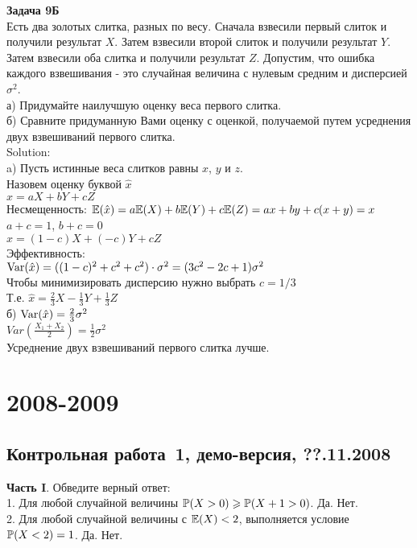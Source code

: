 \documentclass[pdftex,12pt,a4paper]{article}
\begin{document}
\textbf{Задача 9Б} \\
Есть два золотых слитка, разных по весу. Сначала взвесили первый слиток и получили результат $X$. Затем взвесили второй слиток и получили результат $Y$. Затем взвесили оба слитка и получили результат $Z$. Допустим, что ошибка каждого взвешивания - это случайная величина с нулевым средним и дисперсией $\sigma^{2}$. \\
а) Придумайте наилучшую оценку веса первого слитка. \\
б) Сравните придуманную Вами оценку с оценкой, получаемой путем усреднения двух взвешиваний первого слитка. \\ 
Solution: \\
a) Пусть истинные веса слитков равны $x$, $y$ и $z$. \\
Назовем оценку буквой $\hat{x}$ \\
$\hat{x}=aX+bY+cZ$ \\
Несмещенность: $\E(\hat{x})=a\E(X)+b\E(Y)+c\E(Z)=ax+by+c(x+y)=x$ \\
$a+c=1$, $b+c=0$ \\
$\hat{x}=(1-c)X+(-c)Y+cZ$ \\
Эффективность: \\
$\Var(\hat{x})=((1-c)^{2}+c^{2}+c^{2})\cdot \sigma^{2}=(3c^{2}-2c+1)\sigma^{2}$ \\
Чтобы минимизировать дисперсию нужно выбрать $c=1/3$ \\
Т.е. $\hat{x}=\frac{2}{3}X-\frac{1}{3}Y+\frac{1}{3}Z$ \\
б) $\Var(\hat{x})=\frac{2}{3}\sigma^{2}$ \\
$Var\left(\frac{X_{1}+X_{2}}{2}\right)=\frac{1}{2}\sigma^{2}$ \\
Усреднение двух взвешиваний первого слитка лучше. \\

\section{2008-2009}
\subsection{Контрольная работа \No\,1, демо-версия, ??.11.2008}
\pagebreak 
\textbf{Часть I}. Обведите верный ответ: \\

1. Для любой случайной величины $\P(X>0)\ge \P(X+1>0)$. Да. Нет. \\

2. Для любой случайной величины с $\E(X)<2$, выполняется условие $\P(X<2)=1$. Да. Нет. \\
\end{document}
